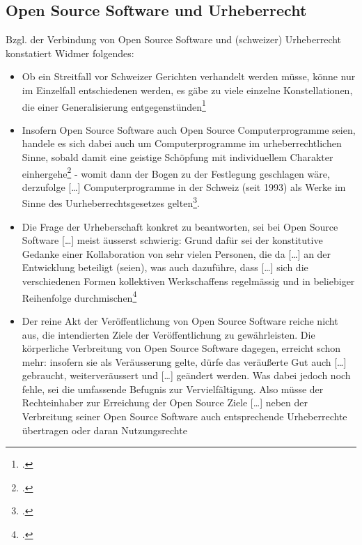 \documentclass[DIV=calc,BCOR=5mm,11pt,headings=small,oneside,abstract=true, toc=bib]{scrartcl}
\begin{document}
\subsection{Open Source Software und Urheberrecht}

Bzgl. der Verbindung von Open Source Software und (schweizer) Urheberrecht
konstatiert Widmer folgendes:
\begin{itemize}
  \item Ob ein Streitfall vor Schweizer Gerichten verhandelt werden müsse, könne
  nur im Einzelfall entschiedenen werden, es gäbe zu viele einzelne
  \glqq{}Konstellationen\grqq{}, die einer Generalisierung
  entgegenstünden\footcite[vgl.][53]{Widmer2003a}
  \item Insofern \glqq{}Open Source Software\grqq{} auch \glqq{}Open
  Source Computerprogramme\grqq{} seien, handele es sich dabei auch um
  \glqq{}Computerprogramme im urheberrechtlichen Sinne\grqq{}, sobald damit
  \glqq{}eine geistige Schöpfung mit individuellem Charakter\grqq{}
  einhergehe\footcite[vgl.][70]{Widmer2003a} - womit dann der Bogen zu der
  Festlegung geschlagen wäre, derzufolge \glqq{}[\ldots]
  Computerprogramme in der Schweiz (seit 1993) als Werke im Sinne des
  Uurheberrechtsgesetzes gelten\grqq{}\footcite[vgl.][2]{Widmer2003a}.
  \item Die Frage der Urheberschaft konkret zu beantworten, sei bei Open Source
  Software \glqq{}[\ldots] meist äusserst schwierig\grqq{}: Grund dafür sei der
  konstitutive Gedanke einer Kollaboration von \glqq{}sehr vielen
  Personen\grqq{}, die da \glqq{}[\ldots] an der Entwicklung beteiligt
  (seien)\grqq{}, was auch dazuführe, dass \glqq{}[\ldots] sich die
  verschiedenen Formen kollektiven Werkschaffens regelmässig und in
  beliebiger Reihenfolge durchmischen\grqq{}\footcite[vgl.][86]{Widmer2003a}
  \item Der reine Akt der Veröffentlichung von Open Source Software reiche nicht
  aus, die intendierten Ziele der Veröffentlichung zu gewährleisten. Die
  \glqq{}kör\-per\-liche Verbreitung von Open Source Software\grqq{} dagegen,
  erreicht schon mehr: insofern sie als \glqq{}Veräusserung\grqq{} gelte, dürfe
  das veräußerte Gut auch \glqq{}[\ldots] gebraucht, weiterveräussert und
  [\ldots] geändert werden\grqq{}. Was dabei jedoch noch fehle, sei die
  \glqq{}umfassende Befugnis zur Vervielfältigung\grqq{}. Also müsse der
  \glqq{}Rechteinhaber\grqq{} zur Erreichung der Open Source Ziele
  \glqq{}[\ldots] neben der Verbreitung seiner Open Source Software auch
  entsprechende Urheberrechte übertragen oder daran Nutzungsrechte

\end{itemize}
\end{document}
